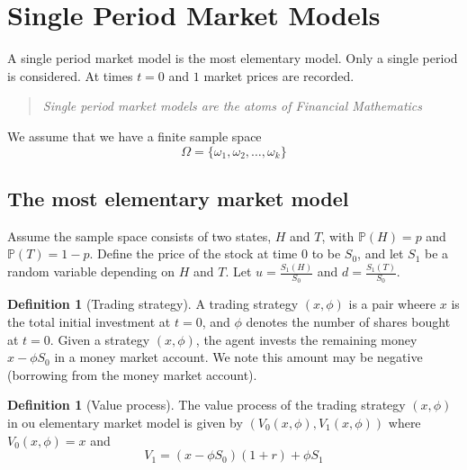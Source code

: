 \documentclass[10pt, oneside, reqno]{amsart}
\theoremstyle{plain}%
\theoremstyle{definition}
\newtheorem{defn}[thm]{Definition}
\theoremstyle{remark}
\newcommand{\prob}[1]{\mathbb{P}(#1)}
\begin{document}


\newcommand{\tst}{(x,\phi)}

\section{Single Period Market Models} %
\label{sec:single_period_market_models}

A single period market model is the most elementary model.  Only a single period is considered.  At times $t=0$ and $1$ market prices are recorded.

\begin{quote}
\emph{	Single period market models are the atoms of Financial Mathematics
}\end{quote}

We assume that we have a finite sample space \[
	\Omega = \{ \omega_1, \omega_2, \dots, \omega_k \}
\]

\subsection{The most elementary market model} %
\label{sub:the_most_elementary_market_model}

Assume the sample space consists of two states, $H$ and $T$, with $\prob{H} = p$ and $ \prob{T} = 1-p$.  Define the price of the stock at time $0$ to be $S_0$, and let $S_1$ be a random variable depending on $H$ and $T$.  Let $u = \frac{S_1(H)}{S_0}$ and $d = \frac{S_1(T)}{S_0}$.  


\begin{defn}[Trading strategy]
	A trading strategy $(x,\phi)$ is a pair wheere $x$ is the total initial investment at $t=0$, and $\phi$ denotes the number of shares bought at $t = 0$.  Given a strategy $(x,\phi)$, the agent invests the remaining money $x - \phi S_0$ in a money market account.  We note this amount may be negative (borrowing from the money market account).
\end{defn}

\begin{defn}[Value process]
	The value process of the trading strategy $(x,\phi)$ in ou elementary market model is given by $(V_0(x,\phi), V_1(x,\phi))$ where $V_0(x,\phi) = x$ and \[
		V_1 = (x - \phi S_0)(1+r) +\phi S_1
	\]
\end{defn}
\end{document}
